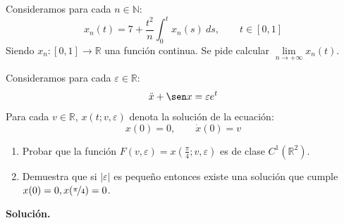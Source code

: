 \documentclass[12pt]{article}
\begin{document}
    \begin{ejercicio}
        Consideramos para cada $n\in \mathbb{N}$:
        \begin{equation*}
            x_n(t) = 7 + \frac{t^2}{n}\int_{0}^{t} x_n(s)~ds , \qquad t\in [0,1]
        \end{equation*}
        Siendo $x_n:[0,1]\to \mathbb{R}$ una función continua. Se pide calcular $\lim\limits_{n\to+\infty}x_n(t)$.
    \end{ejercicio}

    \begin{ejercicio}
        Consideramos para cada $\varepsilon\in \mathbb{R}$:
        \begin{equation*}
            \ddot{x} + \sen x = \varepsilon e^t
        \end{equation*}
        Para cada $v\in \mathbb{R}$, $x(t;v,\varepsilon)$ denota la solución de la ecuación:
        \begin{equation*}
            x(0) = 0, \qquad \dot{x}(0) = v
        \end{equation*}
        \begin{enumerate}
            \item[i)] Probar que la función $F(v,\varepsilon)=x\left(\frac{\pi}{4};v,\varepsilon\right)$ es de clase $C^1(\mathbb{R}^2)$.
            \item[ii)] Demuestra que si $|\varepsilon|$ es pequeño entonces existe una solución que cumple $x(0) = 0, x(\nicefrac{\pi}{4}) = 0$.
        \end{enumerate}
    \end{ejercicio}

    \newpage
    \setcounter{ejercicio}{0} %
    \noindent
    \textbf{Solución.}
    
\end{document}
